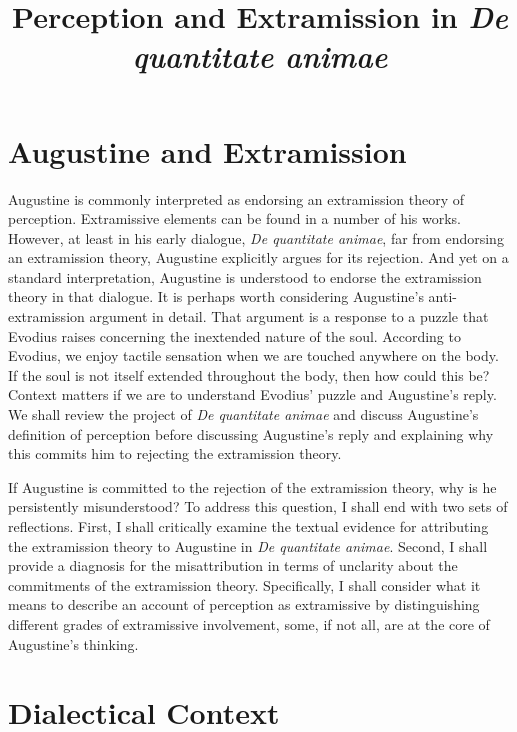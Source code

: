 \documentclass[12pt]{article}
\title{Perception and Extramission in \emph{De quantitate animae}}
\author{\myauthor}
\date{} %
\begin{document}
\maketitle


\setlength{\parindent}{1em}


\section{Augustine and Extramission} %
\label{sec:augustine_and_extramission}

Augustine is commonly interpreted as endorsing an extramission theory of perception. Extramissive elements can be found in a number of his works. However, at least in his early dialogue, \emph{De quantitate animae}, far from endorsing an extramission theory, Augustine explicitly argues for its rejection. And yet on a standard interpretation, Augustine is understood to endorse the extramission theory in that dialogue. It is perhaps worth considering Augustine's anti-extramission argument in detail. That argument is a response to a puzzle that Evodius raises concerning the inextended nature of the soul. According to Evodius, we enjoy tactile sensation when we are touched anywhere on the body. If the soul is not itself extended throughout the body, then how could this be? Context matters if we are to understand Evodius' puzzle and Augustine's reply. We shall review the project of \emph{De quantitate animae} and discuss Augustine's definition of perception before discussing Augustine's reply and explaining why this commits him to rejecting the extramission theory. 

If Augustine is committed to the rejection of the extramission theory, why is he persistently misunderstood? To address this question, I shall end with two sets of reflections. First, I shall critically examine the textual evidence for attributing the extramission theory to Augustine in \emph{De quantitate animae}. Second, I shall provide a diagnosis for the misattribution in terms of unclarity about the commitments of the extramission theory. Specifically, I shall consider what it means to describe an account of perception as extramissive by distinguishing different grades of extramissive involvement, some, if not all, are at the core of Augustine's thinking.


\section{Dialectical Context} %
\label{sec:dialectical_context}
\end{document}
